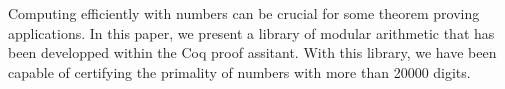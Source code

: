 Computing efficiently with numbers can be crucial for some theorem proving applications.
In this paper, we present a library of modular arithmetic that has been developped within
the {\sc Coq} proof assitant.
With this library, we have been capable of certifying the primality of numbers with
more than 20000 digits.
